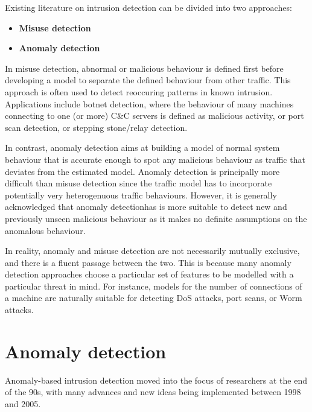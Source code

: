 \documentclass[a4paper,12pt,twoside]{report}
\begin{document}
Existing literature on intrusion detection can be divided into two approaches: 

\begin{itemize}
\item \textbf{Misuse detection}
\item \textbf{Anomaly detection}
\end{itemize} 

In misuse detection, abnormal or malicious behaviour is defined first before developing a model to separate the defined behaviour from other traffic. This approach is often used to detect reoccuring patterns in known intrusion. Applications include botnet detection, where the behaviour of many machines connecting to one (or more) C\&C servers is defined as malicious activity, or port scan detection, or stepping stone/relay detection.

In contrast, anomaly detection aims at building a model of normal system behaviour that is accurate enough to spot any malicious behaviour as traffic that deviates from the estimated model. Anomaly detection is principally more difficult than misuse detection since the traffic model has to incorporate potentially very heterogenuous traffic behaviours. However, it is generally acknowledged that anomaly detectionhas is more suitable to detect new and previously unseen malicious behaviour as it makes no definite assumptions on the anomalous behaviour. 
\linebreak

In reality, anomaly and misuse detection are not necessarily mutually exclusive, and there is a fluent passage between the two. This is because many anomaly detection approaches choose a particular set of features to be modelled with a particular threat in mind. For instance, models for the number of connections of a machine are naturally suitable for detecting DoS attacks, port scans, or Worm attacks. 

\chapter{Anomaly detection}

Anomaly-based intrusion detection moved into the focus of researchers at the end of the 90s, with many advances and new ideas being implemented between 1998 and 2005. 

\end{document}
